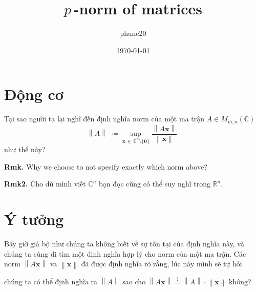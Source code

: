 \documentclass{article}
\title{$p\,$-norm of matrices}
\author{phunc20}
\date{\today}
\newcommand{\norm}[1]{\left\lVert#1\right\rVert}
\begin{document}
\theoremstyle{definition}
\newtheorem{Spiel}{Vd}[section]


\maketitle
\section{Động cơ}
Tại sao người ta lại nghĩ đến định nghĩa norm của một ma trận $A \in M_{m,n}(\mathbb{C})$
$$\norm{A} \,\,\coloneqq\!\! \sup_{\mathbf{x} \,\in\, {\mathbb{C}^{n} \setminus \{\mathbf{0}\}}} \frac{\norm{A\mathbf{x}}}{\norm{\mathbf{x}}}\;$$
như thế này?

\textbf{Rmk.} Why we choose to not specify exactly which norm above?

\textbf{Rmk2.} Cho dù mình viết $\mathbb{C}^n$ bạn đọc cũng có thể suy nghĩ trong $\mathbb{R}^n$.

\section{Ý tưởng}
Bây giờ giả bộ như chúng ta không biết về sự tồn tại của định nghĩa này, và chúng ta cùng đi tìm một định nghĩa hợp lý
cho norm của một ma trận. Các norm $\norm{A\mathbf{x}}$ va $\norm{\mathbf{x}}$ đã được định nghĩa rõ rằng, lúc này  mình sẽ tự hỏi
\begin{displayquote}
chúng ta có thể định nghĩa ra $\norm{A}$ sao cho $\norm{A\mathbf{x}} \stackrel{?}{=} \norm{A}\cdot\norm{\mathbf{x}}$ không?
\end{displayquote}
\end{document}

